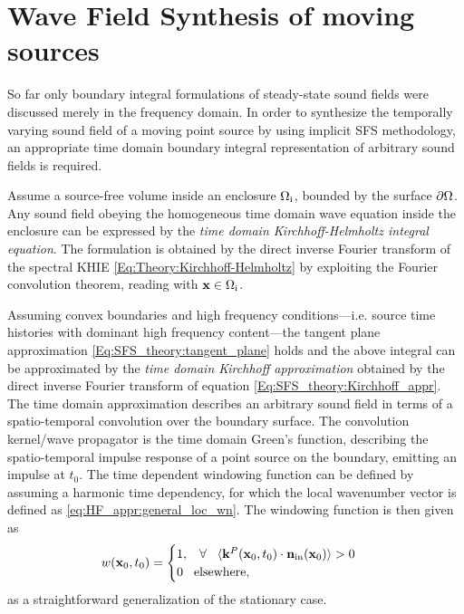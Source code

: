 \section{Wave Field Synthesis of moving sources}
\label{Sec:Moving_source_WFS}

So far only boundary integral formulations of steady-state sound fields were discussed merely in the frequency domain.
In order to synthesize the temporally varying sound field of a moving point source by using implicit SFS methodology, an appropriate time domain boundary integral representation of arbitrary sound fields is required.

Assume a source-free volume inside an enclosure $\Omega_{\mathrm{i}}$, bounded by the surface $\partial \Omega$.
Any sound field obeying the homogeneous time domain wave equation inside the enclosure can be expressed by the \emph{time domain Kirchhoff-Helmholtz integral equation}.
The formulation is obtained by the direct inverse Fourier transform of the spectral KHIE \eqref{Eq:Theory:Kirchhoff-Helmholtz} by exploiting the Fourier convolution theorem, reading
with $\mathbf{x} \in \Omega_{\mathrm{i}}$.	

Assuming convex boundaries and high frequency conditions---i.e. source time histories with dominant high frequency content---the tangent plane approximation \eqref{Eq:SFS_theory:tangent_plane} holds and the above integral can be approximated by the \emph{time domain Kirchhoff approximation}
obtained by the direct inverse Fourier transform of equation \eqref{Eq:SFS_theory:Kirchhoff_appr}.
The time domain approximation describes an arbitrary sound field in terms of a spatio-temporal convolution over the boundary surface.
The convolution kernel/wave propagator is the time domain Green's function, describing the spatio-temporal impulse response of a point source on the boundary, emitting an impulse at $t_0$.
The time dependent windowing function can be defined by assuming a harmonic time dependency, for which the local wavenumber vector is defined as \eqref{eq:HF_appr:general_loc_wn}.
The windowing function is then given as
\begin{equation}
w(\mathbf{x}_0,t_0) = \begin{cases}
                        1, \hspace{3mm} \forall \hspace{3mm} \langle \mathbf{k}^P(\mathbf{x}_0,t_0) \cdot \mathbf{n}_{\mathrm{in}}(\mathbf{x}_0) \rangle > 0 \\
                        0  \hspace{3mm} \text{elsewhere},
                    \end{cases}
\end{equation}
as a straightforward generalization of the stationary case.

